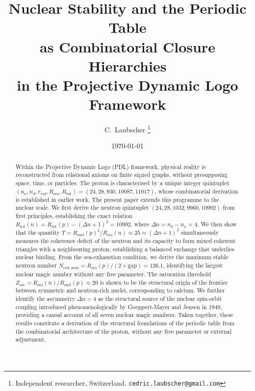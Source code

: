 \documentclass[11pt,a4paper]{article}
\theoremstyle{definition}
\newcommand{\PDL}{\textnormal{PDL}}
\newcommand{\Rsurf}{R_{\mathrm{surf}}}
\newcommand{\Rsea}{R_{\mathrm{sea}}}
\newcommand{\Rtot}{R_{\mathrm{tot}}}
\newcommand{\rval}{r_{\mathrm{val}}}
\newcommand{\Zsat}{Z_{\mathrm{sat}}}
\begin{document}
\title{%
  Nuclear Stability and the Periodic Table\\
  as Combinatorial Closure Hierarchies\\
  in the Projective Dynamic Logo Framework%
}

\author{%
  C.~Laubscher%
  \thanks{Independent researcher, Switzerland. \texttt{cedric.laubscher@gmail.com}}\\[4pt]%
}

\date{\small \today}

\maketitle

\begin{abstract}
Within the Projective Dynamic Logo (\PDL) framework, physical reality is reconstructed from relational axioms on finite signed graphs, without presupposing space, time, or particles.\cite{PDL_Main_2026,PDL_Intro_2026} The proton is characterised by a unique integer quintuplet $(n_u, n_d, \rval, \Rsea, \Rtot) = (24, 28, 930, 10087, 11017)$, whose combinatorial derivation is established in earlier work.\cite{Combinatorial_Proton_v2_2026,Alpha_PDL_v2_2026} The present paper extends this programme to the nuclear scale. We first derive the neutron quintuplet $(24, 28, 1032, 9960, 10992)$ from first principles, establishing the exact relation $\Rtot(n) = \Rtot(p) - (\Delta n + 1)^2 = 10992$, where $\Delta n = n_d - n_u = 4$. We then show that the quantity $T = \Rsurf(p)^2 / \Rsea(n) \approx 25 \approx (\Delta n + 1)^2$ simultaneously measures the coherence deficit of the neutron and its capacity to form mixed coherent triangles with a neighbouring proton, establishing a balanced exchange that underlies nuclear binding. From the sea-exhaustion condition, we derive the maximum stable neutron number $N_{\mathrm{crit,max}} = \Rsea(p) / (2 \times \mathrm{gap}) = 126.1$, identifying the largest nuclear magic number without any free parameter. The saturation threshold $\Zsat = \Rsea(n)/\Rsurf(p) \approx 20$ is shown to be the structural origin of the frontier between symmetric and neutron-rich nuclei, corresponding to calcium. We further identify the asymmetry $\Delta n = 4$ as the structural source of the nuclear spin-orbit coupling introduced phenomenologically by Goeppert-Mayer and Jensen in 1949, providing a causal account of all seven nuclear magic numbers. Taken together, these results constitute a derivation of the structural foundations of the periodic table from the combinatorial architecture of the proton, without any free parameter or external adjustment.
\end{abstract}
\end{document}
